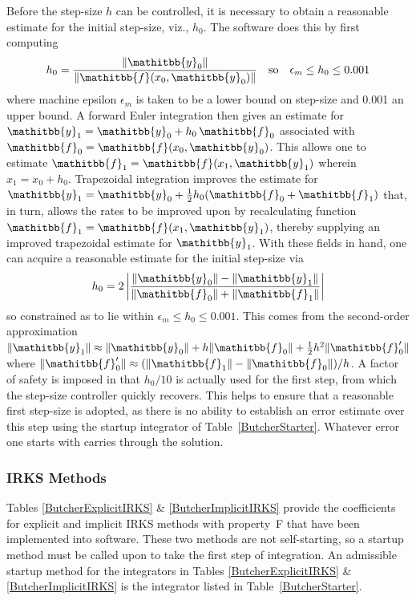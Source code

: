 \documentclass[twocolumn,twoside,fleqn,12pt]{article}
\newcommand{\vecMtx}[1]{\ensuremath{\mathitbb{#1}}}
\begin{document}
Before the step-size $h$ can be controlled, it is necessary to
obtain a reasonable estimate for the initial step-size, viz., $h_0$.  
The software does this by first computing
\begin{displaymath}
   h_0 = \frac{\| \vecMtx{y}_0 \|}{\| \vecMtx{f}(x_0,\vecMtx{y}_0) \|}
   \quad \text{so} \quad
   \epsilon_m \leq h_0 \leq 0.001 
\end{displaymath}
where machine epsilon $\epsilon_m$ is taken to be a lower bound on 
step-size and 0.001 an upper bound.  A forward Euler integration 
then gives an estimate for $\vecMtx{y}_1 = \vecMtx{y}_0 + h_0 \, 
\vecMtx{f}_0$ associated with $\vecMtx{f}_0 = \vecMtx{f}(x_0,\vecMtx{y}_0)$. 
This allows one to estimate $\vecMtx{f}_1 = \vecMtx{f}(x_1,\vecMtx{y}_1)$
wherein $x_1 = x_0 + h_0$.  Trapezoidal integration improves 
the estimate for $\vecMtx{y}_1 = \vecMtx{y}_0 + \frac{1}{2} h_0 
( \vecMtx{f}_0 + \vecMtx{f}_1 )$ that, in turn, allows the 
rates to be improved upon by recalculating function $\vecMtx{f}_1 =
\vecMtx{f}(x_1, \vecMtx{y}_1)$, thereby supplying an improved 
trapezoidal estimate for $\vecMtx{y}_1$.  With these fields in hand, 
one can acquire a reasonable estimate for the initial step-size via
\begin{displaymath}
   h_0 = 2 \left| \frac{\| \vecMtx{y}_0 \| - \| \vecMtx{y}_1 \|}
   {\| \vecMtx{f}_0 \| + \| \vecMtx{f}_1 \|} \right| 
\end{displaymath}
so constrained as to lie within $\epsilon_m \leq h_0 \leq 0.001$. 
This comes from the second-order approximation $\| \vecMtx{y}_1 \|
\approx \| \vecMtx{y}_0 \| + h \| \vecMtx{f}_0 \| + \tfrac{1}{2} h^2 
\| \vecMtx{f}_0^{\prime} \|$ where $\| \vecMtx{f}_0^{\prime} \| \approx 
( \| \vecMtx{f}_1 \| - \| \vecMtx{f}_0 \| ) / h$.  A factor of safety 
is imposed in that $h_0 / 10$ is actually used for the first step, 
from which the step-size controller quickly recovers.  This helps to 
ensure that a reasonable first step-size is adopted, as there is no 
ability to establish an error estimate over this step using the startup 
integrator of Table~\ref{ButcherStarter}.  Whatever error one 
starts with carries through the solution.


\subsubsection{IRKS Methods}

Tables \ref{ButcherExplicitIRKS} \& \ref{ButcherImplicitIRKS} provide
the coefficients for explicit and implicit IRKS methods with property~F
that have been implemented into software.  These two methods are not 
self-starting, so a startup method must be called upon to take the 
first step of integration.  An admissible startup
method for the integrators in Tables \ref{ButcherExplicitIRKS} \&
\ref{ButcherImplicitIRKS} is the integrator listed in
Table~\ref{ButcherStarter}.
\end{document}
